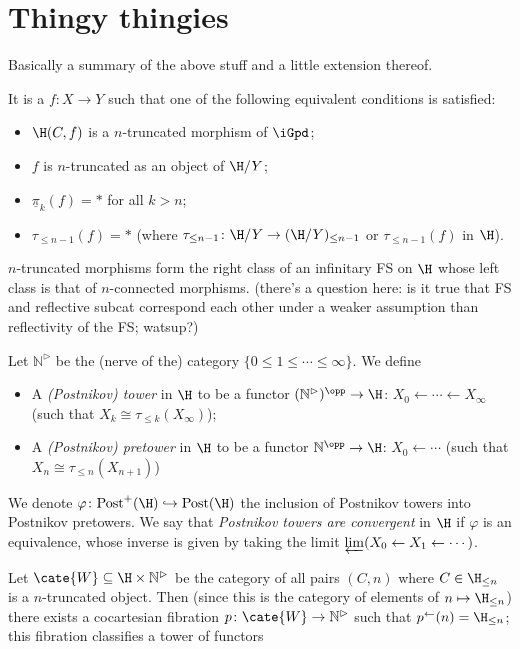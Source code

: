 \documentclass[10pt,a4paper]{amsart}
\begin{document}
\section{Thingy thingies}
Basically a summary of the above stuff and a little extension thereof.
\begin{definition}
It is a $f \colon X\to Y$ such that one of the following equivalent conditions is satisfied:
\begin{itemize}
	\item $\H(C,f)$ is a $n$-truncated morphism of $\iGpd$;
	\item $f$ is $n$-truncated as an object of $\H/Y$;
	\item $\underline{\pi}_k(f) = *$ for all $k>n$;
	\item $\tau_{\le n-1}(f) = *$ (where $\tau_{\le n-1} \colon \H/Y \to (\H/Y)_{\le n-1}$ or $\tau_{\le n-1}(f)$ in $\H$).
\end{itemize}
\end{definition}
\begin{proposition}
$n$-truncated morphisms form the right class of an infinitary FS on $\H$ whose left class is that of $n$-connected morphisms. (there's a question here: is it true that FS and reflective subcat correspond each other under a weaker assumption than reflectivity of the FS; watsup?)
\end{proposition}
\begin{definition}[Towers]
Let $\mathbb{N}^\rhd$ be the (nerve of the) category $\{0\le 1\le \cdots \le \infty\}$. We define
\begin{itemize}
	\item A \emph{(Postnikov) tower} in $\H$ to be a functor $(\mathbb{N}^\rhd)^\opp \to \H$: $X_0\leftarrow \cdots \leftarrow X_\infty$ (such that $X_k \cong \tau_{\le k}(X_\infty)$);
	\item A \emph{(Postnikov) pretower} in $\H$ to be a functor $\mathbb{N}^\opp \to \H$: $X_0\leftarrow \cdots$ (such that $X_n\cong \tau_{\le n}(X_{n+1})$)
\end{itemize}
We denote $\varphi \colon \text{Post}^+(\H) \hookrightarrow \text{Post}(\H)$ the inclusion of Postnikov towers into Postnikov pretowers. We say that \emph{Postnikov towers are convergent} in $\H$ if $\varphi$ is an equivalence, whose inverse is given by taking the limit $\varprojlim (X_0\leftarrow X_1\leftarrow \cdots)$.
\end{definition}
Let $\cate{W}\subseteq \H \times \mathbb{N}^\rhd$ be the category of all pairs $(C,n)$ where $C\in\H_{\le n}$ is a $n$-truncated object. Then (since this is the category of elements of $n\mapsto \H_{\le n}$) there exists a cocartesian fibration $p \colon \cate{W} \to \mathbb{N}^\rhd$ such that $p^\leftarrow(n) = \H_{\le n}$; this fibration classifies a tower of functors
\end{document}
